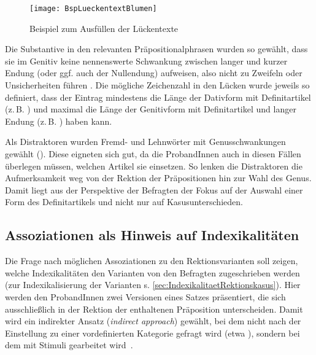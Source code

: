 \begin{figure}
\centering
\texttt{[image: BspLueckentextBlumen]}
\caption{Beispiel zum Ausfüllen der Lückentexte}
\label{pic:BspLUE}
\end{figure}

Die Substantive in den relevanten Präpositionalphrasen wurden so gewählt, dass sie im Genitiv keine nennenswerte Schwankung zwischen langer und kurzer Endung (oder ggf. auch der Nullendung) aufweisen, also nicht zu Zweifeln oder Unsicherheiten führen \citep[zu Zweifelsfällen bei Genitivendungen s. etwa][]{Szczepaniak2014}. Die mögliche Zeichenzahl in den Lücken wurde jeweils so definiert, dass der Eintrag mindestens die Länge der Dativform mit Definitartikel (z.\,B. ) und maximal die Länge der Genitivform mit Definitartikel und langer Endung (z.\,B. ) haben kann. 

Als Distraktoren wurden Fremd- und Lehnwörter mit Genusschwankungen gewählt (). Diese eigneten sich gut, da die ProbandInnen auch in diesen Fällen überlegen müssen, welchen Artikel sie einsetzen. So lenken die Distraktoren die Aufmerksamkeit weg von der Rektion der Präpositionen hin zur Wahl des Genus. Damit liegt aus der Perspektive der Befragten der Fokus auf der Auswahl einer Form des Definitartikels und nicht nur auf Kasusunterschieden. 
\subsection{Assoziationen als Hinweis auf Indexikalitäten} 
\label{sec:Ass}
Die Frage nach möglichen Assoziationen zu den Rektionsvarianten soll zeigen, welche Indexikalitäten den Varianten von den Befragten zugeschrieben werden (zur Indexikalisierung der Varianten s. \autoref{sec:IndexikalitaetRektionskasus}). 
Hier werden den ProbandInnen zwei Versionen eines Satzes präsentiert, die sich ausschließlich in der Rektion der enthaltenen Präposition unterscheiden. 
Damit wird ein indirekter Ansatz (\textit{indirect approach}) gewählt, bei dem nicht nach der Einstellung zu einer vordefinierten Kategorie gefragt wird (etwa ), sondern bei dem mit Stimuli gearbeitet wird~\citep[s.][1251--1252]{Garrett2005}. 

